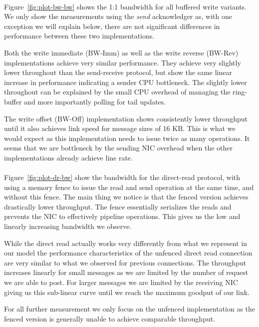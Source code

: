 \paragraph{} Figure~\ref{fig:plot-bw-bw} shows the 1:1 bandwidth for all buffered write variants. We only show the measurements
using the \emph{send} acknowledger as, with one exception we will explain below, there are not significant differences
in performance between these two implementations.

Both the write immediate (BW-Imm) as well
as the write reverse (BW-Rev) implementations achieve very similar performance. They achieve very slightly lower throughout
than the send-receive protocol, but show the same linear increase in performance indicating a sender CPU bottleneck. The
slightly lower throughout can be explained by the small CPU overhead of managing the ring-buffer and more importantly  
polling for tail updates.

The write offset (BW-Off) implementation shows consistently lower throughput until it also achieves
link speed for message sizes of 16 KB. This is what we would expect as this implementation needs to issue 
twice as many operations. It seems that we are bottleneck by the sending NIC overhead when the other
implementations already achieve line rate.

\paragraph{} Figure~\ref{fig:plot-dr-bw} show the bandwidth for the direct-read protocol, with using a memory fence
to issue the read and send operation at the same time, and without this fence.  The main thing we notice is that the 
fenced version achieves drastically lower throughput. The fence essentially serializes the reads and prevents the NIC 
to effectively pipeline operations. This gives us the low and linearly increasing bandwidth we observe.

While the direct read actually works very differently from what we represent in our model the performance 
characteristics of the unfenced direct read connection are very similar to what we observed for previous connections. The
throughput increases linearly for small messages as we are limited by the number of request we are able to post. For larger
messages we are limited by the receiving NIC giving us this sub-linear curve until we reach the maximum goodput of our link.

For all further measurement we only focus on the unfenced implementation as the fenced version is generally unable
to achieve comparable throughput.


